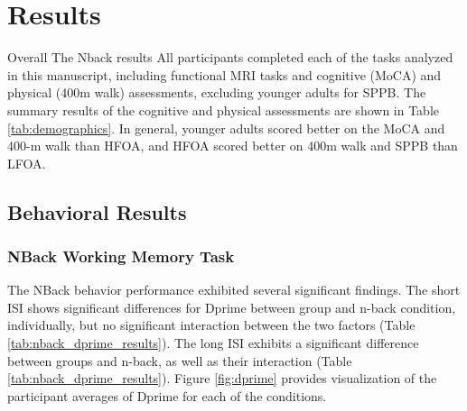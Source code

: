 \documentclass[a4paper,fleqn]{cas-sc}
\begin{document}
\section{Results}	

Overall The Nback results 
All participants completed each of the tasks analyzed in this manuscript, including functional MRI tasks and cognitive (MoCA) and physical (400m walk) assessments, excluding younger adults for SPPB. The summary results of the cognitive and physical assessments are shown in Table \ref{tab:demographics}. In general, younger adults scored better on the MoCA and 400-m walk than HFOA, and HFOA scored better on 400m walk and SPPB than LFOA.  

\subsection{Behavioral Results}
\subsubsection{NBack Working Memory Task}

The NBack behavior performance exhibited several significant findings. The short ISI shows significant differences for Dprime between group and n-back condition, individually, but no significant interaction between the two factors (Table \ref{tab:nback_dprime_results}). The long ISI exhibits a significant difference between groups and n-back, as well as their interaction (Table \ref{tab:nback_dprime_results}). Figure \ref{fig:dprime} provides visualization of the participant averages of Dprime for each of the conditions.
\end{document}
